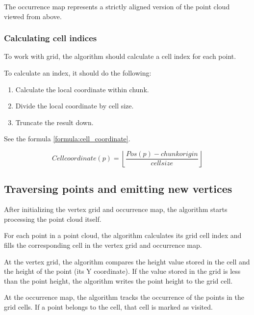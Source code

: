 The occurrence map represents a strictly aligned version of the point cloud viewed from above.


\subsubsection{Calculating cell indices}

To work with grid, the algorithm should calculate a cell index for each point.

To calculate an index, it should do the following:
\begin{enumerate}
    \item Calculate the local coordinate within chunk.
    \item Divide the local coordinate by cell size.
    \item Truncate the result down.
\end{enumerate}

See the formula \ref{formula:cell_coordinate}.

\begin{equation}
\label{formula:cell_coordinate}
Cell coordinate(p) = \left \lfloor \frac{Pos(p) - chunk origin}{cell size} \right \rfloor
\end{equation}


\subsection{Traversing points and emitting new vertices}
\label{subsec:emitting_vertices}

After initializing the vertex grid and occurrence map, the algorithm starts processing the point cloud itself.

For each point in a point cloud, the algorithm  calculates its grid cell index and fills the corresponding cell in the vertex grid and occurrence map.

At the vertex grid, the algorithm compares the height value stored in the cell and the height of the point (its Y coordinate). If the value stored in the grid is less than the point height, the algorithm writes the point height to the grid cell.

At the occurrence map, the algorithm tracks the occurrence of the points in the grid cells. If a point belongs to the cell, that cell is marked as visited.


\begin{algorithm}
\end{algorithm}


